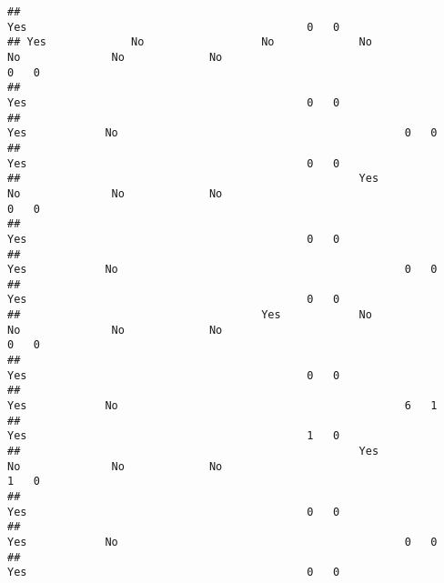 \documentclass[
]{article}
\begin{document}
\begin{verbatim}
##                                                                                                          Yes                                           0   0
## Yes             No                  No             No                     No              No             No                                            0   0
##                                                                                                          Yes                                           0   0
##                                                                                           Yes            No                                            0   0
##                                                                                                          Yes                                           0   0
##                                                    Yes                    No              No             No                                            0   0
##                                                                                                          Yes                                           0   0
##                                                                                           Yes            No                                            0   0
##                                                                                                          Yes                                           0   0
##                                     Yes            No                     No              No             No                                            0   0
##                                                                                                          Yes                                           0   0
##                                                                                           Yes            No                                            6   1
##                                                                                                          Yes                                           1   0
##                                                    Yes                    No              No             No                                            1   0
##                                                                                                          Yes                                           0   0
##                                                                                           Yes            No                                            0   0
##                                                                                                          Yes                                           0   0

\end{verbatim}
\end{document}
